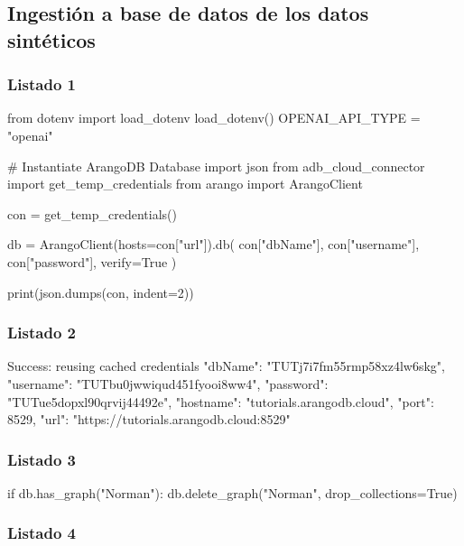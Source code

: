 \subsection{Ingestión a base de datos de los datos sintéticos}

\subsubsection{Listado 1}
\label{anexo:code-4-4-1-1}

\begin{APACode}
from dotenv import load_dotenv
load_dotenv()
OPENAI_API_TYPE = "openai"

# Instantiate ArangoDB Database
import json
from adb_cloud_connector import get_temp_credentials
from arango import ArangoClient

con = get_temp_credentials()

db = ArangoClient(hosts=con["url"]).db(
    con["dbName"], con["username"], con["password"], verify=True
)

print(json.dumps(con, indent=2))
\end{APACode}

\subsubsection{Listado 2}
\label{anexo:code-4-4-1-2}

\begin{APACode}
Success: reusing cached credentials
{
  "dbName": "TUTj7i7fm55rmp58xz4lw6skg",
  "username": "TUTbu0jwwiqud451fyooi8ww4",
  "password": "TUTue5dopxl90qrvij44492e",
  "hostname": "tutorials.arangodb.cloud",
  "port": 8529,
  "url": "https://tutorials.arangodb.cloud:8529"
}
\end{APACode}

\subsubsection{Listado 3}
\label{anexo:code-4-4-1-3}

\begin{APACode}
if db.has_graph("Norman"):
    db.delete_graph("Norman", drop_collections=True)
\end{APACode}

\subsubsection{Listado 4}
\label{anexo:code-4-4-1-4}

